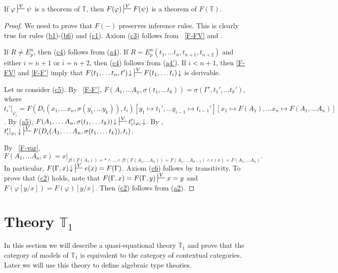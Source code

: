 \documentclass[reqno]{amsart}
\newcommand{\axref}[1]{(\hyperref[ax:#1]{#1})}
\theoremstyle{definition}
\theoremstyle{remark}
\numberwithin{figure}{section}
\begin{document}
\begin{prop}
If $\varphi \sststile{}{V} \psi$ is a theorem of $\mathbb{T}$, then $F(\varphi) \sststile{}{V} F(\psi)$ is a theorem of $F(\mathbb{T})$.
\end{prop}
\begin{proof}
We need to prove that $F(-)$ preserves inference rules.
This is clearly true for rules \axref{b1}-\axref{b6} and \axref{c1}.
Axiom \axref{c3} follows from ~\eqref{F-FV} and .

If $R \neq E^n_p$, then \axref{c4} follows from \axref{a4}.
If $R = E^n_p(t_1, \ldots t_n, t_{n+1}, t_{n+2})$ and either $i = n+1$ or $i = n+2$, then \axref{c4} follows from \axref{a4'}.
If $i < n+1$, then  \eqref{F-FV} and \eqref{F-F'} imply that $F(t_1, \ldots t_n, t')\!\downarrow\ \sststile{}{V} F(t_1, \ldots t_i)\!\downarrow$ is derivable.

Let us consider \axref{c5}.
By ~\eqref{F-F'}, $F(A_1, \ldots A_n, \sigma(t_1, \ldots t_k)) = \sigma(\Gamma', t_1', \ldots t_k')$, where
    $t_i'|_{\varphi_i} = F(D_i(x_1, \ldots x_n, \sigma(y_1, \ldots y_k)), t_i)[y_1 \mapsto t_1', \ldots y_{i-1} \mapsto t_{i-1}'][x_1 \mapsto F(A_1), \ldots x_n \mapsto F(A_1, \ldots A_n)]$.
By \axref{a5}, $F(A_1, \ldots A_n, \sigma(t_1, \ldots t_k))\!\downarrow\ \sststile{}{V} t_i'|_{\varphi_i}\!\downarrow$.
By , $t_i'|_{\varphi_i}\!\downarrow\ \sststile{}{V} F(D_i(A_1, \ldots A_n, \sigma(t_1, \ldots t_k)), t_i)$.

By ~\eqref{F-var},
\[ F(A_1, \ldots A_n, x) = x|_{ft(F(A_1)) = * \land \ldots \land ft(F(A_1, \ldots A_n)) = F(A_1, \ldots A_{n-1}) \land e(x) = F(A_1, \ldots A_n)}. \]
In particular, $F(\Gamma,x)\!\downarrow\ \sststile{}{V} e(x) = F(\Gamma)$.
Axiom \axref{c6} follows by transitivity.
To prove that \axref{c2} holds, note that $F(\Gamma,x) = F(\Gamma,y) \sststile{}{V} x = y$ and $F(\varphi[y/x]) = F(\varphi)[y/x]$.
Then \axref{c2} follows from \axref{a2}.
\end{proof}

\label{sec:T1}
\section{Theory $\mathbb{T}_1$}


In this section we will describe a quasi-equational theory $\mathbb{T}_1$ and prove that the category of models of $\mathbb{T}_1$ is equivalent to the category of contextual categories.
Later we will use this theory to define algebraic type theories.
\end{document}
